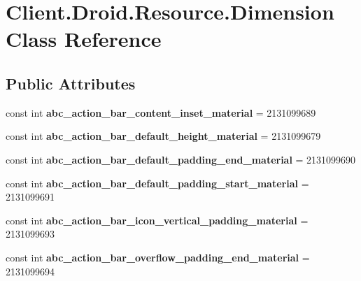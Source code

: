 \hypertarget{classClient_1_1Droid_1_1Resource_1_1Dimension}{}\section{Client.\+Droid.\+Resource.\+Dimension Class Reference}
\label{classClient_1_1Droid_1_1Resource_1_1Dimension}
\subsection*{Public Attributes}
\begin{DoxyCompactItemize}
\item 
\hypertarget{classClient_1_1Droid_1_1Resource_1_1Dimension_a80eeed73c231d5363b066f56264b5e3b}{}const int {\bfseries abc\+\_\+action\+\_\+bar\+\_\+content\+\_\+inset\+\_\+material} = 2131099689\label{classClient_1_1Droid_1_1Resource_1_1Dimension_a80eeed73c231d5363b066f56264b5e3b}

\item 
\hypertarget{classClient_1_1Droid_1_1Resource_1_1Dimension_a3b98b809b81c37b4545d679e8d0a2394}{}const int {\bfseries abc\+\_\+action\+\_\+bar\+\_\+default\+\_\+height\+\_\+material} = 2131099679\label{classClient_1_1Droid_1_1Resource_1_1Dimension_a3b98b809b81c37b4545d679e8d0a2394}

\item 
\hypertarget{classClient_1_1Droid_1_1Resource_1_1Dimension_adad7c59223350fa77da8f840ced0b5ff}{}const int {\bfseries abc\+\_\+action\+\_\+bar\+\_\+default\+\_\+padding\+\_\+end\+\_\+material} = 2131099690\label{classClient_1_1Droid_1_1Resource_1_1Dimension_adad7c59223350fa77da8f840ced0b5ff}

\item 
\hypertarget{classClient_1_1Droid_1_1Resource_1_1Dimension_a6737e809f352f83d9b93e0809397dd89}{}const int {\bfseries abc\+\_\+action\+\_\+bar\+\_\+default\+\_\+padding\+\_\+start\+\_\+material} = 2131099691\label{classClient_1_1Droid_1_1Resource_1_1Dimension_a6737e809f352f83d9b93e0809397dd89}

\item 
\hypertarget{classClient_1_1Droid_1_1Resource_1_1Dimension_ab82283979d267b60cf17e15409cc315e}{}const int {\bfseries abc\+\_\+action\+\_\+bar\+\_\+icon\+\_\+vertical\+\_\+padding\+\_\+material} = 2131099693\label{classClient_1_1Droid_1_1Resource_1_1Dimension_ab82283979d267b60cf17e15409cc315e}

\item 
\hypertarget{classClient_1_1Droid_1_1Resource_1_1Dimension_ae1647b4513b884cc6671a782f0a35e3b}{}const int {\bfseries abc\+\_\+action\+\_\+bar\+\_\+overflow\+\_\+padding\+\_\+end\+\_\+material} = 2131099694\label{classClient_1_1Droid_1_1Resource_1_1Dimension_ae1647b4513b884cc6671a782f0a35e3b}


\end{DoxyCompactItemize}

